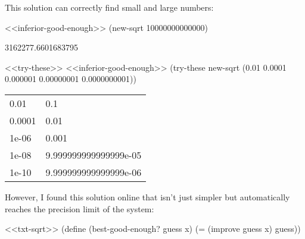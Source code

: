 \documentclass[
]{article}
\newenvironment{Shaded}{}{}
\newcommand{\DecValTok}[1]{\textcolor[rgb]{0.25,0.63,0.44}{#1}}
\newcommand{\ExtensionTok}[1]{#1}
\newcommand{\FloatTok}[1]{\textcolor[rgb]{0.25,0.63,0.44}{#1}}
\newcommand{\FunctionTok}[1]{\textcolor[rgb]{0.02,0.16,0.49}{#1}}
\newcommand{\NormalTok}[1]{#1}
\newcommand{\OperatorTok}[1]{\textcolor[rgb]{0.40,0.40,0.40}{#1}}
\begin{document}
This solution can correctly find small and large numbers:

\begin{Shaded}
\begin{Highlighting}[numbers=left,,]
\NormalTok{\textless{}\textless{}inferior{-}good{-}enough\textgreater{}\textgreater{}}
\NormalTok{(new{-}sqrt }\DecValTok{10000000000000}\NormalTok{)}
\end{Highlighting}
\end{Shaded}

3162277.6601683795

\hypertarget{EX1-7-t2}{%
\label{EX1-7-t2}}%
\begin{Shaded}
\begin{Highlighting}[numbers=left,,]
\NormalTok{\textless{}\textless{}try{-}these\textgreater{}\textgreater{}}
\NormalTok{\textless{}\textless{}inferior{-}good{-}enough\textgreater{}\textgreater{}}
\NormalTok{(try{-}these new{-}sqrt \textquotesingle{}(}\FloatTok{0.01} \FloatTok{0.0001} \FloatTok{0.000001} \FloatTok{0.00000001} \FloatTok{0.0000000001}\NormalTok{))}
\end{Highlighting}
\end{Shaded}

\begin{longtable}[]{@{}ll@{}}
\toprule
\endhead
0.01 & 0.1 \\
0.0001 & 0.01 \\
1e-06 & 0.001 \\
1e-08 & 9.999999999999999e-05 \\
1e-10 & 9.999999999999999e-06 \\
\bottomrule
\end{longtable}

However, I found this solution online that isn't just simpler but
automatically reaches the precision limit of the system:

\hypertarget{new-good-enough}{%
\label{new-good-enough}}%
\begin{Shaded}
\begin{Highlighting}[numbers=left,,]
\NormalTok{\textless{}\textless{}txt{-}sqrt\textgreater{}\textgreater{}}
\NormalTok{(}\ExtensionTok{define}\FunctionTok{ }\NormalTok{(best{-}good{-}enough? guess x)}
\NormalTok{   (}\OperatorTok{=}\NormalTok{ (improve guess x) guess))}
\end{Highlighting}
\end{Shaded}
\end{document}

